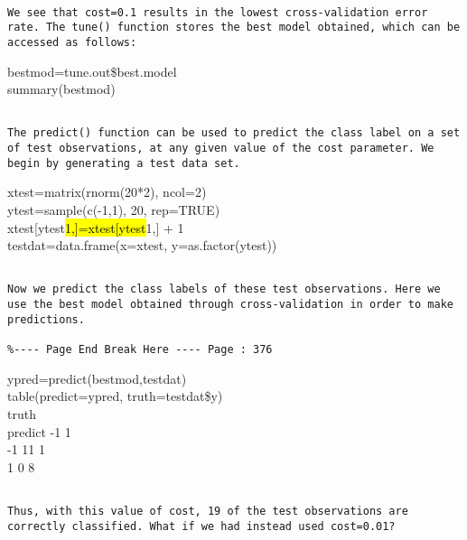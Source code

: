 \documentclass[10pt]{article}
\begin{document}
\begin{verbatim}

We see that cost=0.1 results in the lowest cross-validation error rate. The tune() function stores the best model obtained, which can be accessed as follows:
\end{verbatim}

\begin{displayquote}
bestmod=tune.out\$best.model\\
summary(bestmod)
\end{displayquote}

\begin{verbatim}

The predict() function can be used to predict the class label on a set of test observations, at any given value of the cost parameter. We begin by generating a test data set.
\end{verbatim}

\begin{displayquote}
xtest=matrix(rnorm(20*2), ncol=2)\\
ytest=sample(c(-1,1), 20, rep=TRUE)\\
xtest[ytest\hl{1,]=xtest[ytest}1,] + 1\\
testdat=data.frame(x=xtest, y=as.factor(ytest))
\end{displayquote}

\begin{verbatim}

Now we predict the class labels of these test observations. Here we use the best model obtained through cross-validation in order to make predictions.

%---- Page End Break Here ---- Page : 376
\end{verbatim}

\begin{displayquote}
ypred=predict(bestmod,testdat)\\
table(predict=ypred, truth=testdat\$y)\\
truth\\
predict -1 1\\
-1 11 1\\
1 0 8
\end{displayquote}

\begin{verbatim}

Thus, with this value of cost, 19 of the test observations are correctly classified. What if we had instead used cost=0.01?
\end{verbatim}
\end{document}
